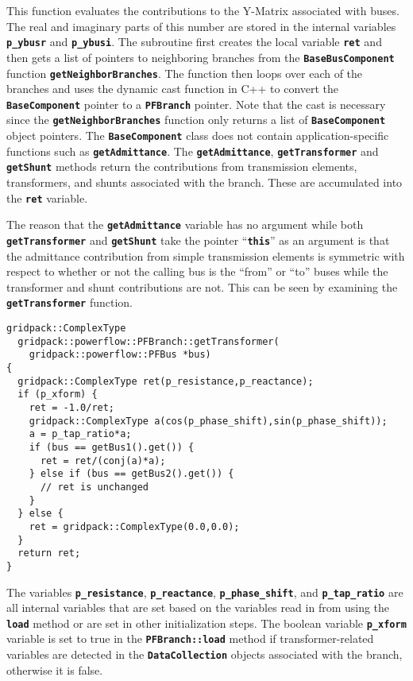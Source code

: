 This function evaluates the contributions to the Y-Matrix associated with buses. The real and imaginary parts of this number are stored in the internal variables \texttt{\textbf{p\_ybusr}} and \texttt{\textbf{p\_ybusi}}. The subroutine first creates the local variable \texttt{\textbf{ret}} and then gets a list of pointers to neighboring branches from the \texttt{\textbf{BaseBusComponent}} function \texttt{\textbf{getNeighborBranches}}. The function then loops over each of the branches and uses the dynamic cast function in C++ to convert the \texttt{\textbf{BaseComponent}} pointer to a \texttt{\textbf{PFBranch}} pointer. Note that the cast is necessary since the \texttt{\textbf{getNeighborBranches}} function only returns a list of \texttt{\textbf{BaseComponent}} object pointers. The \texttt{\textbf{BaseComponent}} class does not contain application-specific functions such as \texttt{\textbf{getAdmittance}}. The \texttt{\textbf{getAdmittance}}, \texttt{\textbf{getTransformer}} and \texttt{\textbf{getShunt}} methods return the contributions from transmission elements, transformers, and shunts associated with the branch. These are accumulated into the \texttt{\textbf{ret}} variable.

The reason that the \texttt{\textbf{getAdmittance}} variable has no argument while both \texttt{\textbf{getTransformer}} and \texttt{\textbf{getShunt}} take the pointer ``\texttt{\textbf{this}}'' as an argument is that the admittance contribution from simple transmission elements is symmetric with respect to whether or not the calling bus is the ``from'' or ``to'' buses while the transformer and shunt contributions are not. This can be seen by examining the \texttt{\textbf{getTransformer}} function.

{
\color{red}
\begin{Verbatim}[fontseries=b]
gridpack::ComplexType
  gridpack::powerflow::PFBranch::getTransformer(
    gridpack::powerflow::PFBus *bus)
{
  gridpack::ComplexType ret(p_resistance,p_reactance);
  if (p_xform) {
    ret = -1.0/ret;
    gridpack::ComplexType a(cos(p_phase_shift),sin(p_phase_shift));
    a = p_tap_ratio*a;
    if (bus == getBus1().get()) {
      ret = ret/(conj(a)*a);
    } else if (bus == getBus2().get()) {
      // ret is unchanged
    }
  } else {
    ret = gridpack::ComplexType(0.0,0.0);
  }
  return ret;
}
\end{Verbatim}
}

The variables \texttt{\textbf{p\_resistance}}, \texttt{\textbf{p\_reactance}}, \texttt{\textbf{p\_phase\_shift}}, and \texttt{\textbf{p\_tap\_ratio}} are all internal variables that are set based on the variables read in from using the \texttt{\textbf{load}} method or are set in other initialization steps. The boolean variable \texttt{\textbf{p\_xform}} variable is set to true in the \texttt{\textbf{PFBranch::load}} method if transformer-related variables are detected in the \texttt{\textbf{DataCollection}} objects associated with the branch, otherwise it is false.

